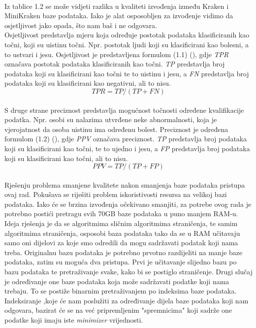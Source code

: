 \documentclass[times, utf8, zavrsni]{fer}
\begin{document}
\\Iz tablice 1.2 se može vidjeti razlika u kvaliteti izvođenja između Kraken i MiniKraken baze podataka. Iako je alat osposobljen za izvođenje vidimo da osjetljivost jako opada, što nam baš i ne odgovara.
\\Osjetljivost predstavlja mjeru koja određuje postotak podataka klasificiranih kao točni, koji su uistinu točni. Npr. postotak ljudi koji su klasificirani kao bolesni, a to ustvari i jesu. Osjetljivost je predstavljena formulom (1.1) (\cite{Definicija}), gdje \textit{TPR} označava postotak podataka klasificiranih kao točni. \textit{TP} predstavlja broj podataka koji su klasificirani kao točni te to uistinu i jesu, a \textit{FN} predstavlja broj podataka koji su klasificirani kao negativni, ali to nisu.
\begin{equation}
TPR = TP / (TP + FN)
\end{equation}
\\S druge strane preciznost predstavlja mogućnost točnosti određene kvalifikacije podatka. Npr. osobi su nalazima utvrđene neke abnormalnosti, koja je vjerojatnost da osoba uistinu ima određenu bolest. Preciznost je određena formulom (1.2) (\cite{Definicija}), gdje \textit{PPV} označava preciznost. \textit{TP} predstavlja broj podataka koji su klasificirani kao točni, te to ujedno i jesu, a \textit{FP} predstavlja broj podataka koji su klasificirani kao točni, ali to nisu.
\begin{equation}
PPV = TP / (TP + FP)
\end{equation}
\\Rješenju problema smanjene kvalitete nakon smanjenja baze podataka pristupa ovaj rad. Pokušava se riješiti problem iskoristivosti resursa na velikoj bazi podataka. Iako će se brzina izvođenja očekivano smanjiti, za potrebe ovog rada je potrebno postići pretragu svih 70GB baze podataka u puno manjem RAM-u. Ideja rješenja je da se algoritmima sličnim algoritmima straničenja, te samim algoritmima straničenja, osposobi baza podataka tako da se u RAM učitavaju samo oni dijelovi za koje smo odredili da mogu sadržavati podatak koji nama treba. Originalnu bazu podataka je potrebno prvotno razdijeliti na manje baze podataka, zatim su moguća dva pristupa. Prvi je učitavanje slijedno bazu po bazu podataka te pretraživanje svake, kako bi se postiglo straničenje. Drugi slučaj je određivanje one baze podataka koja može sadržavati podatke koji nama trebaju. To se postiže binarnim pretraživanjem po indeksima baze podataka. Indeksiranje ,koje će nam poslužiti za određivanje dijela baze podataka koji nam odgovara, bazirat će se na već pripremljenim "spremnicima" koji sadrže one podatke koji imaju iste \textit{minimizer} vrijednosti. 
\end{document}
